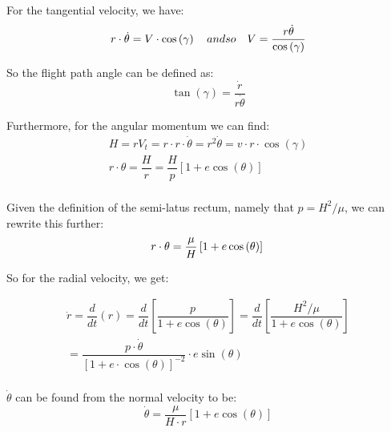 For the tangential velocity, we have:
\begin{equation}
    r \cdot \dot{\theta}=V\cdot \cos \left( \gamma \right) \quad and so \quad V=\dfrac {r \dot{\theta}}{\cos \left( \gamma \right) } \\
\end{equation}

So the flight path angle can be defined as:
\begin{equation}
    \tan (\gamma) = \frac{\dot{r}}{r\dot{\theta}}
\end{equation}

Furthermore, for the angular momentum we can find:
\begin{equation}
\begin{split}
    H=rV_{t}=r\cdot r\cdot \dot{\theta} =r^{2}\dot{\theta} =v\cdot r\cdot \cos \left( \gamma \right)\\
    r\cdot \theta =\dfrac {H}{r} =\dfrac {H}{p}\left[ 1+e\cos \left( \theta \right) \right] \\
\end{split}
\end{equation}

Given the definition of the semi-latus rectum, namely that $p = H^2/\mu$, we can rewrite this further:
\begin{equation}
     r\cdot \theta =\dfrac {\mu}{H}\left[ 1+e\cos \left( \theta \right) \right] \\
\end{equation}

So for the radial velocity, we get:

\begin{equation}\label{eq:manihatethis}
\begin{split}
    \dot{r}=\dfrac {d}{dt}\left( r\right) =\dfrac {d}{dt}\left[ \dfrac {p}{1+e\cos \left( \theta \right) }\right] =\dfrac {d}{dt}\left[ \dfrac {H^2/\mu}{1+e\cos \left( \theta \right) }\right]\\
    = \dfrac {p\cdot \dot{\theta} }{\left[ 1+e\cdot \cos \left( \theta \right) \right] ^{-2}}\cdot e\sin \left( \theta \right) \\ 
\end{split}
\end{equation}

$\dot{\theta}$ can be found from the normal velocity to be:
\begin{equation}
    \dot{\theta} =\dfrac {\mu }{H\cdot r}\left[ 1+e\cos \left( \theta \right) \right] 
\end{equation}

